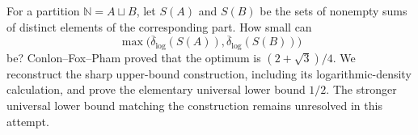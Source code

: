 For a partition $\mathbb N=A\sqcup B$, let $S(A)$ and $S(B)$ be the sets of nonempty sums of distinct elements of the corresponding part. How small can
\[
 \max\bigl(\overline\delta_{\log}(S(A)),
           \overline\delta_{\log}(S(B))\bigr)
\]
be? Conlon--Fox--Pham proved that the optimum is $(2+\sqrt3)/4$.
We reconstruct the sharp upper-bound construction, including its logarithmic-density calculation, and prove the elementary universal lower bound $1/2$. The stronger universal lower bound matching the construction remains unresolved in this attempt.
